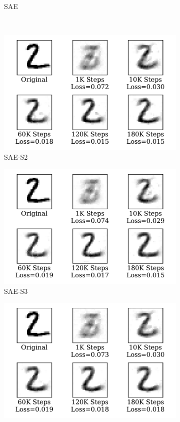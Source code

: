 \begin{figure}
\begin{subfigure}[t]{0.32\textwidth}
		\caption{SAE}
	\end{subfigure}\\
	\begin{subfigure}[t]{0.32\textwidth}
		\includegraphics[width=\textwidth]{pics_sdlm/42_MNIST_SAE_noise/recon_digit.pdf}
		\caption{SAE-S2}
	\end{subfigure}
	\begin{subfigure}[t]{0.32\textwidth}
		\includegraphics[width=\textwidth]{pics_sdlm/41_MNIST_SAE_teach/recon_digit.pdf}
		\caption{SAE-S3}
	\end{subfigure}
	\begin{subfigure}[t]{0.32\textwidth}
		\includegraphics[width=\textwidth]{pics_sdlm/43_MNIST_SAE_all/recon_digit.pdf}

\end{subfigure}
\end{figure}
